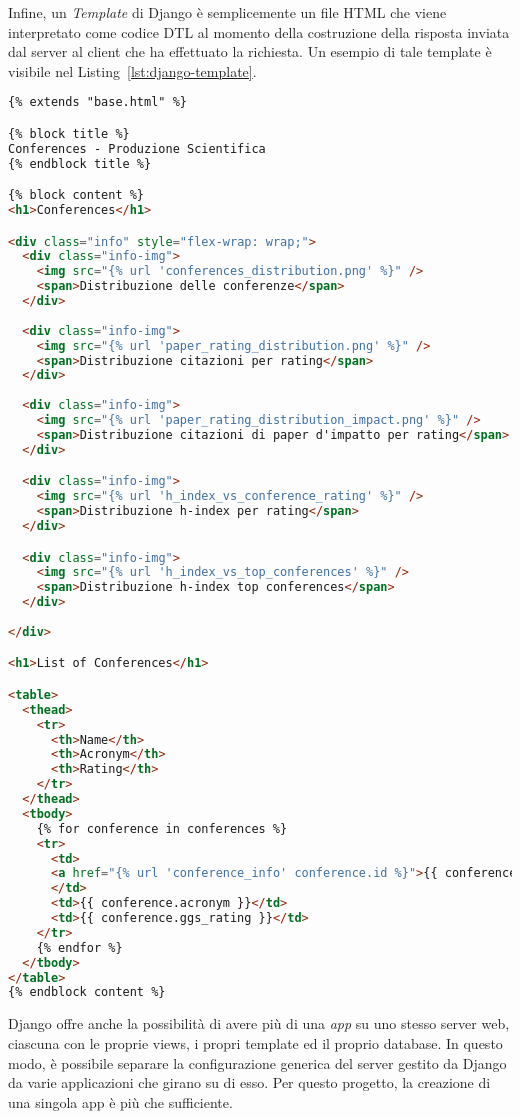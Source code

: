 Infine, un \textit{Template} di Django è semplicemente un file HTML che
viene interpretato come codice DTL al momento della costruzione della risposta
inviata dal server al client che ha effettuato la richiesta. Un esempio di tale
template è visibile nel Listing~\ref{lst:django-template}.

\begin{lstlisting}[language=HTML, caption=Template per l'elenco delle conferenze,label=lst:django-template]
{% extends "base.html" %}

{% block title %}
Conferences - Produzione Scientifica
{% endblock title %}

{% block content %}
<h1>Conferences</h1>

<div class="info" style="flex-wrap: wrap;">
  <div class="info-img">
    <img src="{% url 'conferences_distribution.png' %}" />
    <span>Distribuzione delle conferenze</span>
  </div>
  
  <div class="info-img">
    <img src="{% url 'paper_rating_distribution.png' %}" />
    <span>Distribuzione citazioni per rating</span>
  </div>
  
  <div class="info-img">
    <img src="{% url 'paper_rating_distribution_impact.png' %}" />
    <span>Distribuzione citazioni di paper d'impatto per rating</span>
  </div>

  <div class="info-img">
    <img src="{% url 'h_index_vs_conference_rating' %}" />
    <span>Distribuzione h-index per rating</span>
  </div>

  <div class="info-img">
    <img src="{% url 'h_index_vs_top_conferences' %}" />
    <span>Distribuzione h-index top conferences</span>
  </div>
  
</div>

<h1>List of Conferences</h1>

<table>
  <thead>
    <tr>
      <th>Name</th>
      <th>Acronym</th>
      <th>Rating</th>
    </tr>
  </thead>
  <tbody>
    {% for conference in conferences %}
    <tr>
      <td>
      <a href="{% url 'conference_info' conference.id %}">{{ conference.name }}</a>
      </td>
      <td>{{ conference.acronym }}</td>
      <td>{{ conference.ggs_rating }}</td>
    </tr>
    {% endfor %}
  </tbody>
</table>
{% endblock content %}
\end{lstlisting}

Django offre anche la possibilità di avere più di una \textit{app} su uno stesso
server web, ciascuna con le proprie views, i propri template ed il proprio
database. In questo modo, è possibile separare la configurazione generica del
server gestito da Django da varie applicazioni che girano su di esso.
Per questo progetto, la creazione di una singola app è più che sufficiente.

